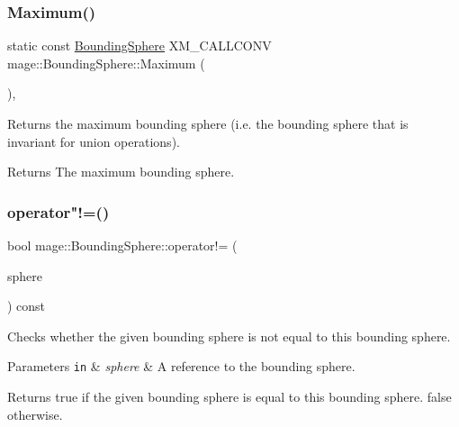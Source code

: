 \subsubsection{\texorpdfstring{Maximum()}{Maximum()}}
{\footnotesize\ttfamily static const \hyperlink{classmage_1_1_bounding_sphere}{Bounding\+Sphere} X\+M\+\_\+\+C\+A\+L\+L\+C\+O\+NV mage\+::\+Bounding\+Sphere\+::\+Maximum (\begin{DoxyParamCaption}{ }\end{DoxyParamCaption})\hspace{0.3cm}{\ttfamily [static]}, {\ttfamily [noexcept]}}

Returns the maximum bounding sphere (i.\+e. the bounding sphere that is invariant for union operations).

\begin{DoxyReturn}{Returns}
The maximum bounding sphere. 
\end{DoxyReturn}
\hypertarget{classmage_1_1_bounding_sphere_a841979aaee8a82784674296801aa5fbc}{}\label{classmage_1_1_bounding_sphere_a841979aaee8a82784674296801aa5fbc} 
\subsubsection{\texorpdfstring{operator"!=()}{operator!=()}}
{\footnotesize\ttfamily bool mage\+::\+Bounding\+Sphere\+::operator!= (\begin{DoxyParamCaption}\item[{const \hyperlink{classmage_1_1_bounding_sphere}{Bounding\+Sphere} \&}]{sphere }\end{DoxyParamCaption}) const\hspace{0.3cm}{\ttfamily [noexcept]}}

Checks whether the given bounding sphere is not equal to this bounding sphere.


\begin{DoxyParams}[1]{Parameters}
\mbox{\tt in}  & {\em sphere} & A reference to the bounding sphere. \\
\hline
\end{DoxyParams}
\begin{DoxyReturn}{Returns}
{\ttfamily true} if the given bounding sphere is equal to this bounding sphere. {\ttfamily false} otherwise. 
\end{DoxyReturn}
\hypertarget{classmage_1_1_bounding_sphere_ad8159156e4258d23afdb43e4a9104743}{}\label{classmage_1_1_bounding_sphere_ad8159156e4258d23afdb43e4a9104743} 
